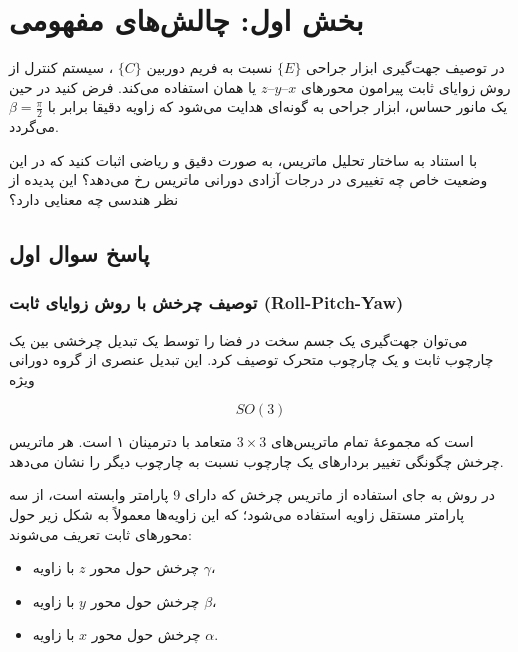 \documentclass{article}
\begin{document}


\tableofcontents \clearpage
\listoffigures \clearpage
\listoftables \clearpage
\lstlistoflistings \clearpage
\newpage

\section{بخش اول:  چالش‌های مفهومی}


در توصیف جهت‌گیری  ابزار جراحی $\{E\}$ نسبت به فریم دوربین $\{C\}$ ، سیستم کنترل از روش زوایای ثابت پیرامون محورهای $x$--$y$--$z$ یا همان  استفاده می‌کند. فرض کنید در حین یک مانور حساس، ابزار جراحی به گونه‌ای هدایت می‌شود که زاویه  دقیقا برابر با $\beta = \frac{\pi}{2}$ می‌گردد. 


با استناد به ساختار تحلیل ماتریس، به صورت دقیق و ریاضی اثبات کنید که در این وضعیت خاص چه تغییری در درجات آزادی دورانی ماتریس رخ می‌دهد؟ این پدیده از نظر هندسی چه معنایی دارد؟

\subsection{ پاسخ سوال اول}
\subsubsection{ توصیف چرخش با روش زوایای ثابت (Roll-Pitch-Yaw)}

می‌توان جهت‌گیری یک جسم سخت  در فضا را توسط یک تبدیل چرخشی بین یک چارچوب ثابت و یک چارچوب متحرک توصیف کرد. این تبدیل عنصری از گروه دورانی ویژه

\[
SO(3)
\]

است که مجموعهٔ تمام ماتریس‌های $3 \times 3$ متعامد  با دترمینان ۱ است. هر ماتریس چرخش  چگونگی تغییر بردارهای یک چارچوب نسبت به چارچوب دیگر را نشان می‌دهد.

در روش  به جای استفاده از ماتریس چرخش که دارای 9 پارامتر وابسته است، از سه پارامتر مستقل زاویه استفاده می‌شود؛ که این زاویه‌ها معمولاً به شکل زیر حول محورهای ثابت تعریف می‌شوند:

\begin{itemize}
	\item چرخش   حول محور $z$ با زاویه $\gamma$،
	\item چرخش   حول محور $y$ با زاویه $\beta$،
	\item چرخش   حول محور $x$ با زاویه $\alpha$.
\end{itemize}
\end{document}
